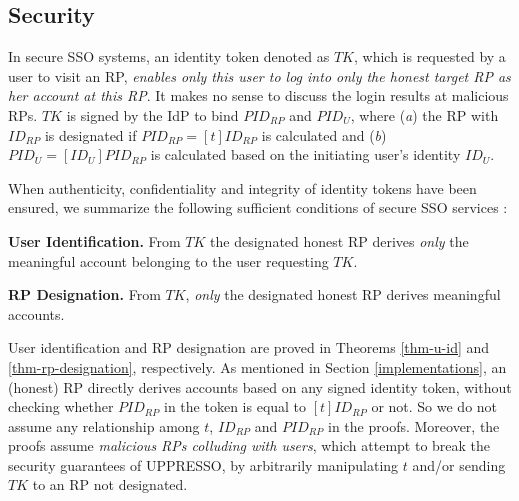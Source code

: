 \subsection{Security}
\label{analysis-security}

In secure SSO systems, an identity token denoted as $TK$, which is requested by a user to visit an RP,
    \emph{enables only this user to log into only the honest target RP as her account at this RP}. It makes no sense to discuss the login results at malicious RPs.
$TK$ is signed by the IdP to bind $PID_{RP}$ and $PID_U$,
where (\emph{a}) the RP with $ID_{RP}$ is designated if $PID_{RP} = [t]ID_{RP}$ is calculated
    and (\emph{b}) $PID_U = [ID_U]PID_{RP}$ is calculated based on the initiating user's identity $ID_U$.

When authenticity, confidentiality and integrity of identity tokens have been ensured, we summarize the following sufficient conditions of secure SSO services \cite{FettKS14,BrowserID,SPRESSO}:

\noindent \textbf{User Identification.} %
From $TK$ the designated honest RP derives \emph{only} the meaningful account belonging to the user requesting $TK$.

\noindent \textbf{RP Designation.} From $TK$, \emph{only} the designated honest RP derives meaningful accounts.


User identification and RP designation are proved in Theorems \ref{thm-u-id} and \ref{thm-rp-designation}, respectively.
As mentioned in Section \ref{implementations}, an (honest) RP directly derives accounts based on any signed identity token, without checking whether $PID_{RP}$ in the token is equal to $[t]ID_{RP}$ or not.
So we do not assume any relationship among $t$, $ID_{RP}$ and $PID_{RP}$ in the proofs.
Moreover,
the proofs assume \emph{malicious RPs colluding with users},
                which attempt to break the security guarantees of UPPRESSO,
by arbitrarily manipulating $t$ and/or sending $TK$ to an RP not designated.

